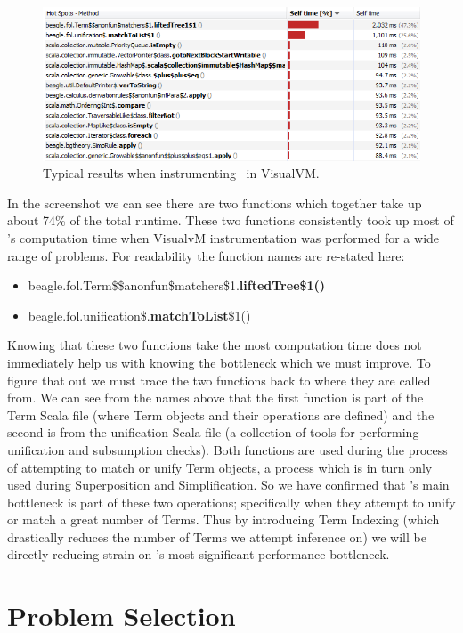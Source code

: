 \begin{figure}[H]
  \includegraphics[width=\textwidth]{resources/visualvm}
  \caption{Typical results when instrumenting \beagle\  in VisualVM.}
  \label{fig:visvm}
\end{figure}

In the screenshot we can see there are two functions which together take up about
74\% of the total runtime. These two functions consistently took up most of \beagle's
computation time when VisualvM instrumentation was performed for a wide range of problems.
For readability the function names are re-stated here:
\begin{itemize}
\item[]beagle.fol.Term\$\$anonfun\$matchers\$1.\textbf{liftedTree\$1()}
\item[]beagle.fol.unification\$.\textbf{matchToList}\$1()
\end{itemize}
Knowing that these two functions take the most computation time does not immediately
help us with knowing the bottleneck which we must improve. To figure that out we must
trace the two functions back to where they are called from. We can see from the
names above that the first function is part of the Term Scala file (where Term objects and their
operations are defined) and the second is from the unification Scala file (a collection
of tools for performing unification and subsumption checks). Both functions are
used during the process of attempting to match or unify Term objects, a process
which is in turn only used during Superposition and Simplification. So we have confirmed
that \beagle's main bottleneck is part of these two operations; specifically when they attempt
to unify or match a great number of Terms. Thus by introducing Term Indexing
(which drastically reduces the number of Terms we attempt inference on) we will
be directly reducing strain on \beagle's most significant performance bottleneck.

\section{Problem Selection}
\label{sec:problems}

